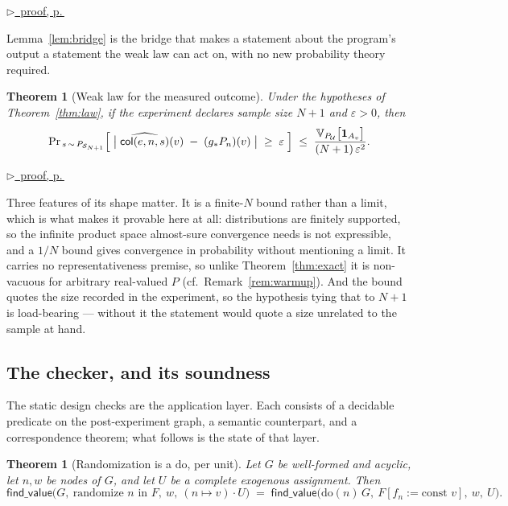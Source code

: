 \documentclass[11pt,a4paper]{article}
\theoremstyle{definition}
\theoremstyle{plain}
\newtheorem{theorem}[definition]{Theorem}
\theoremstyle{remark}
\newcommand{\Ctx}{\mathcal{U}}         %
\newcommand{\fv}{\mathsf{find\_value}}
\newcommand{\push}[1]{{#1}_{*}}        %
\newcommand{\Smp}{\mathcal{S}}         %
\newcommand{\emp}[1]{\widehat{#1}}
\newcommand{\Ind}[1]{\mathbf{1}_{#1}}
\newcommand{\Var}{\mathbb{V}}
\renewcommand{\Pr}{\mathrm{Pr}}
\newcommand{\pfref}[1]{%
  \par\smallskip\noindent
  \hyperref[pf:#1]{\small$\triangleright$\ proof, p.\,\pageref{pf:#1}}\par\smallskip}
\begin{document}
\pfref{lem:bridge}

Lemma~\ref{lem:bridge} is the bridge that makes a statement about the
program's output a statement the weak law can act on, with no new
probability theory required.

\begin{theorem}[Weak law for the measured outcome]
\label{thm:lln}
Under the hypotheses of Theorem~\ref{thm:law}, if the experiment declares
sample size $N+1$ and $\varepsilon > 0$, then
\[
  \Pr_{\,s \,\sim\, P_{\Smp_{N+1}}}
  \Bigl[\;
     \bigl|\;\emp{\mathsf{col}(e,n,s)}(v) \;-\; (\push{g}P_n)(v)\;\bigr|
     \;\ge\; \varepsilon
  \;\Bigr]
  \;\le\;
  \frac{\Var_{P_\Ctx}\bigl[\Ind{A_v}\bigr]}{(N+1)\,\varepsilon^{2}} .
\]
\end{theorem}

\pfref{thm:lln}

Three features of its shape matter. It is a finite-$N$ bound rather than a
limit, which is what makes it provable here at all: distributions are
finitely supported, so the infinite product space almost-sure convergence
needs is not expressible, and a $1/N$ bound gives convergence in
probability without mentioning a limit. It carries no representativeness
premise, so unlike Theorem~\ref{thm:exact} it is non-vacuous for arbitrary
real-valued $P$ (cf.\ Remark~\ref{rem:warmup}). And the bound quotes the
size recorded in the experiment, so the hypothesis tying that to $N+1$ is
load-bearing --- without it the statement would quote a size unrelated to
the sample at hand.


\subsection{The checker, and its soundness}

The static design checks are the application layer. Each consists of a
decidable predicate on the post-experiment graph, a semantic counterpart,
and a correspondence theorem; what follows is the state of that layer.

\begin{theorem}[Randomization is a $\mathrm{do}$, per unit]
\label{thm:randdo}
Let $G$ be well-formed and acyclic, let $n,w$ be nodes of $G$, and let $U$
be a complete exogenous assignment. Then
\[
  \fv\bigl(G,\ \text{randomize } n \text{ in } F,\ w,\ (n\mapsto v)\cdot U\bigr)
  \;=\;
  \fv\bigl(\mathrm{do}(n)\,G,\ F[f_n := \text{const } v],\ w,\ U\bigr).
\]
\end{theorem}
\end{document}
